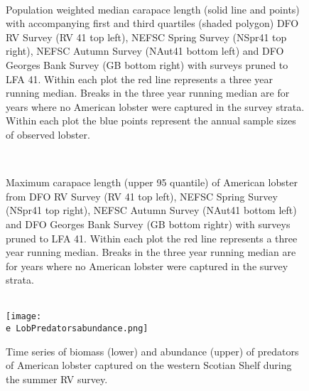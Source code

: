 \documentclass[11pt]{article}
\newcommand{\D}{.}
\newcommand{\e}{/backup/bio_data/bio.lobster/figures/} %
\begin{document}
\begin{figure}
\centering
{}\\

\caption{Population weighted median carapace length (solid line and points) with accompanying first and third quartiles (shaded polygon) DFO RV Survey (RV 41 top left), NEFSC Spring Survey (NSpr41 top right), NEFSC Autumn Survey (NAut41 bottom left) and DFO Georges Bank Survey (GB bottom right) with surveys pruned to LFA 41. Within each plot the red line represents a three year running median. Breaks in the three year running median are for years where no American lobster were captured in the survey strata. Within each plot the blue points represent the annual sample sizes of observed lobster.}
\end{figure}
\clearpage




\begin{figure}
\centering
{}\\

\caption{Maximum carapace length (upper 95 quantile) of American lobster from DFO RV Survey (RV 41 top left), NEFSC Spring Survey (NSpr41 top right), NEFSC Autumn Survey (NAut41 bottom left) and DFO Georges Bank Survey (GB bottom rightr) with surveys pruned to LFA 41. Within each plot the red line represents a three year running median. Breaks in the three year running median are for years where no American lobster were captured in the survey strata. }
\end{figure}
\clearpage


\begin{figure}
\centering
    \\
    \texttt{[image: \\e LobPredatorsabundance.png]}\\
    \caption{Time series of biomass (lower) and abundance (upper) of predators of American lobster captured on the western Scotian Shelf during the summer RV survey.}

\end{figure}
\end{document}
